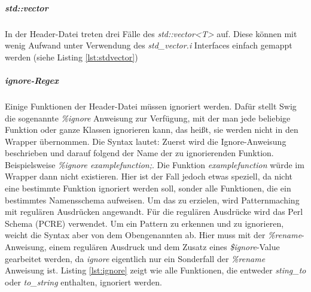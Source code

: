 \begin{code}[caption={std::map},label={lst:stdmap}, escapechar=|]

	

\end{code}

\subparagraph{std::vector}

In der Header-Datei treten drei Fälle des \emph{std::vector<T>} auf. Diese können mit wenig Aufwand unter Verwendung des \emph{std\_vector.i} Interfaces einfach gemappt werden (siehe Listing \ref{lst:stdvector})

\begin{code}[caption={std::vector},label={lst:stdvector}, escapechar=|]

\end{code}

\subparagraph{ignore-Regex}
Einige Funktionen der Header-Datei müssen ignoriert werden. Dafür stellt Swig die sogenannte \emph{\%ignore} Anweisung zur Verfügung, mit der man jede beliebige Funktion oder ganze Klassen ignorieren kann, das heißt, sie werden nicht in den Wrapper übernommen. Die Syntax lautet: Zuerst wird die Ignore-Anweisung beschrieben und darauf folgend der Name der zu ignorierenden Funktion. Beispielsweise \emph{\%ignore examplefunction;}. Die Funktion \emph{examplefunction} würde im Wrapper dann nicht existieren. Hier ist der Fall jedoch etwas speziell, da nicht eine bestimmte Funktion ignoriert werden soll, sonder alle Funktionen, die ein bestimmtes Namensschema aufweisen. Um das zu erzielen, wird Patternmaching mit regulären Ausdrücken angewandt. Für die regulären Ausdrücke wird das Perl Schema (PCRE) verwendet. Um ein Pattern zu erkennen und zu ignorieren, weicht die Syntax aber von dem Obengenannten ab. Hier muss mit der \emph{\%rename}-Anweisung, einem regulären Ausdruck und dem Zusatz eines \emph{\$ignore}-Value gearbeitet werden, da \emph{ignore} eigentlich nur ein Sonderfall der \emph{\%rename} Anweisung ist.
Listing \ref{lst:ignore} zeigt wie alle Funktionen, die entweder \emph{sting\_to} oder \emph{to\_string} enthalten, ignoriert werden.

